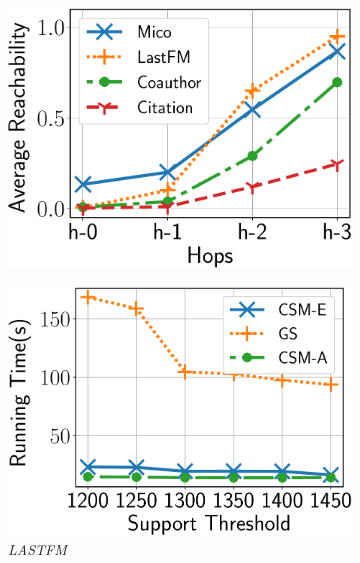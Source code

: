 \begin{figure}[tb!]
	\vspace{-2mm}
	\centering
	\begin{subfigure}[b]{0.21\textwidth}
	\includegraphics[scale=0.22]{img2/lastfm/lastfm_reachability.pdf}
	\caption{}
	\label{fig:reachability}
	\end{subfigure}%
	\begin{subfigure}[b]{0.21\textwidth}
		\includegraphics[scale=0.22]{img2/lastfm/lastfm_h1.pdf}
		\caption{{\em LASTFM}}
		\label{fig:lastfm_h1}
	\end{subfigure}%
	\begin{subfigure}[b]{0.21\textwidth}

\end{subfigure}
\end{figure}

